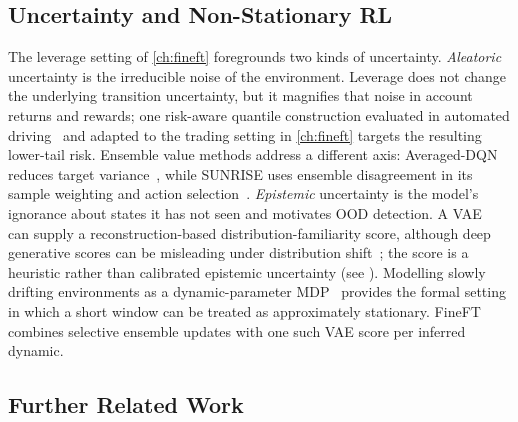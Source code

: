 \subsection{Uncertainty and Non-Stationary RL}
\label{sec:bg_uncertainty}

The leverage setting of \cref{ch:fineft} foregrounds two kinds of uncertainty. \emph{Aleatoric} uncertainty is the irreducible noise of the environment. Leverage does not change the underlying transition uncertainty, but it magnifies that noise in account returns and rewards; one risk-aware quantile construction evaluated in automated driving~\cite{bernhard2019addressing} and adapted to the trading setting in \cref{ch:fineft} targets the resulting lower-tail risk. Ensemble value methods address a different axis: Averaged-DQN reduces target variance~\cite{anschel2017averaged}, while SUNRISE uses ensemble disagreement in its sample weighting and action selection~\cite{lee2021sunrise}. \emph{Epistemic} uncertainty is the model's ignorance about states it has not seen and motivates OOD detection. A VAE~\cite{kingma2013auto} can supply a reconstruction-based distribution-familiarity score, although deep generative scores can be misleading under distribution shift~\cite{zhang2021understanding}; the score is a heuristic rather than calibrated epistemic uncertainty (see ). Modelling slowly drifting environments as a dynamic-parameter MDP~\cite{xie2020deep} provides the formal setting in which a short window can be treated as approximately stationary. FineFT combines selective ensemble updates with one such VAE score per inferred dynamic.

\subsection{Further Related Work}
\label{sec:bg_further}

